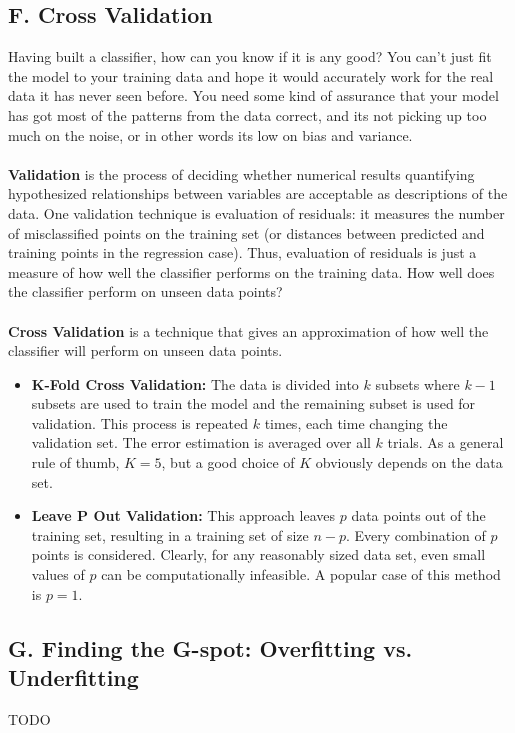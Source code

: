 \documentclass[10pt]{article}
\begin{document}
		\subsection*{F. Cross Validation}
			Having built a classifier, how can you know if it is any good? You can't just  fit the model to your 
			training data and hope it would accurately work for the real data it has never seen before. You 
			need some kind of assurance that your model has got most of the patterns from the data correct, 
			and its not picking up too much on the noise, or in other words its low on bias and variance. \\\\
			\textbf{Validation} is the process of deciding whether numerical results quantifying hypothesized 
			relationships between variables are acceptable as descriptions of the data. One validation technique 
			is evaluation of residuals: it measures the number of misclassified points on the training set (or 
			distances between predicted and training points in the regression case). Thus, evaluation of residuals
			is just a measure of how well the classifier performs on the training data. How well does the classifier
			perform on unseen data points? \\\\ 
			\textbf{Cross Validation} is a technique that gives an approximation of how well the 
			classifier will perform on unseen data points. 
			\begin{itemize}
				\item \textbf{K-Fold Cross Validation:} The data is divided into $k$ subsets where $k-1$ subsets 
				are used to train the model and the remaining subset is used for validation. This process is 
				repeated $k$ times, each time changing the validation set. The error estimation is averaged over
				all $k$ trials. As a general rule of thumb, $K = 5$, but a good choice of $K$ obviously depends
				on the data set. 
				\item \textbf{Leave P Out Validation:} This approach leaves $p$ data points out of the training set,
				resulting in a training set of size $n-p$. Every combination of $p$ points is considered. Clearly, for 
				any reasonably sized data set, even small values of $p$ can be computationally infeasible. A popular
				case of this method is $p=1$. 
			\end{itemize}
		\subsection*{G. Finding the G-spot: Overfitting vs. Underfitting}
			TODO
\end{document}
